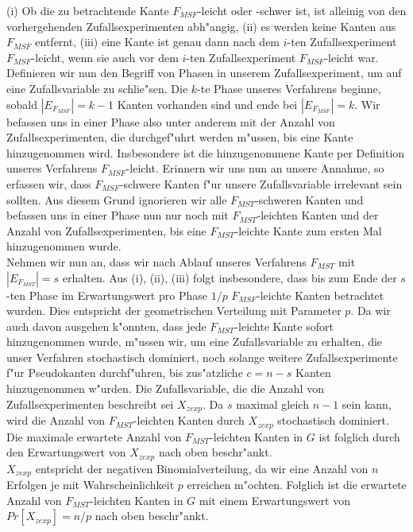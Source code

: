 (i) Ob die zu betrachtende Kante $F_{MSF}$-leicht oder -schwer ist, 
    ist alleinig von den vorhergehenden Zufallsexperimenten abh"angig,
    (ii) es werden keine Kanten aus $F_{MSF}$ entfernt,
    (iii) eine Kante ist genau dann nach dem $i$-ten Zufallsexperiment 
    $F_{MSF}$-leicht, wenn sie auch vor dem $i$-ten Zufallsexperiment $F_{MSF}$-leicht
    war.\\
Definieren wir nun den Begriff von Phasen in unserem Zufallsexperiment, um auf
    eine Zufallsvariable zu schlie"sen.
    Die $k$-te Phase unseres Verfahrens beginne, sobald $|E_{F_{MSF}}| = k-1$ Kanten
    vorhanden sind und ende bei $|E_{F_{MSF}}| = k$.
    Wir befassen uns in einer Phase also unter anderem mit der Anzahl von 
    Zufallsexperimenten, die durchgef"uhrt werden m"ussen, 
    bis eine Kante hinzugenommen wird.
    Insbesondere ist die hinzugenommene Kante per Definition unseres Verfahrens
    $F_{MSF}$-leicht. Erinnern wir uns nun an unsere Annahme, so erfassen wir,
    dass $F_{MSF}$-schwere Kanten f"ur unsere Zufallsvariable irrelevant sein
    sollten. Aus diesem Grund ignorieren wir alle $F_{MST}$-schweren Kanten und
    befassen uns in einer Phase nun nur noch mit $F_{MST}$-leichten Kanten und
    der Anzahl von Zufallsexperimenten, bis eine $F_{MST}$-leichte Kante zum 
    ersten Mal hinzugenommen wurde.\\
Nehmen wir nun an, dass wir nach Ablauf unseres Verfahrens $F_{MST}$ mit
    $|E_{F_{MST}}| = s$ erhalten. Aus (i), (ii), (iii) folgt insbesondere, dass bis zum Ende
    der $s$-ten Phase im Erwartungswert pro Phase $1/p$ $F_{MSF}$-leichte
    Kanten betrachtet wurden. Dies entspricht der geometrischen Verteilung mit
    Parameter $p$. Da wir auch davon ausgehen k"onnten, dass jede $F_{MST}$-leichte
    Kante sofort hinzugenommen wurde, m"ussen wir, um eine Zufallsvariable zu 
    erhalten, die unser Verfahren stochastisch dominiert, noch solange weitere 
    Zufallsexperimente f"ur Pseudokanten durchf"uhren, bis zus"atzliche 
    $c=n-s$ Kanten hinzugenommen w"urden.
    Die Zufallsvariable, die die Anzahl von Zufallsexperimenten beschreibt sei
    $X_{zexp}$.
    Da $s$ maximal gleich $n-1$ sein kann, wird die Anzahl von $F_{MST}$-leichten
    Kanten durch $X_{zexp}$ stochastisch dominiert.
    Die maximale erwartete Anzahl von $F_{MST}$-leichten Kanten in $G$ ist folglich durch den
    Erwartungswert von $X_{zexp}$ nach oben beschr"ankt.\\
$X_{zexp}$ entspricht der negativen Binomialverteilung, da wir eine Anzahl von
    $n$ Erfolgen je mit Wahrscheinlichkeit $p$ erreichen m"ochten. 
    Folglich ist die erwartete Anzahl von $F_{MST}$-leichten Kanten in $G$ mit
    einem Erwartungswert von
    $Pr[X_{zexp}] = n/p$ nach oben beschr"ankt.\\
